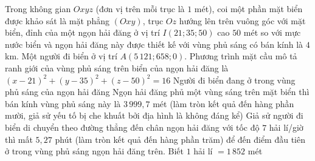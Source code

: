 \begin{ex}%
	Trong không gian $Oxyz$ (đơn vị trên mỗi trục là $1$ mét), coi một phần mặt biển được khảo sát là mặt phẳng $(Oxy)$, trục $Oz$ hướng lên trên vuông góc với mặt biển, đỉnh của một ngọn hải đăng ở vị trí $I(21; 35; 50)$ cao $50$ mét so với mực nước biển và ngọn hải đăng này được thiết kế với vùng phủ sáng có bán kính là $4$ km. Một người đi biển ở vị trí $A(5\,121; 658; 0)$.
	\choiceTF
	{Phương trình mặt cầu mô tả ranh giới của vùng phủ sáng trên biển của ngọn hải đăng là $(x-21)^2 + (y-35)^2 + (z-50)^2 = 16$}
	{Người đi biển đang ở trong vùng phủ sáng của ngọn hải đăng}
	{\True Ngọn hải đăng phủ một vùng sáng trên mặt biển thì bán kính vùng phủ sáng này là $3\,999,7$ mét (làm tròn kết quả đến hàng phần mười, giả sử yếu tố bị che khuất bởi địa hình là không đáng kể)}
	{\True Giả sử người đi biển di chuyển theo đường thẳng đến chân ngọn hải đăng với tốc độ $7$ hải lí/giờ thì mất $5,27$ phút (làm tròn kết quả đến hàng phần trăm) để đến điểm đầu tiên ở trong vùng phủ sáng ngọn hải đăng trên. Biết $1$ hải lí $= 1\,852$ mét}
	
\end{ex}
